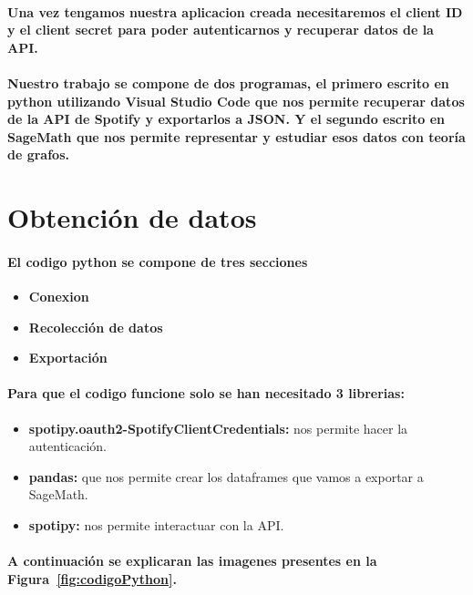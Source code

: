 \documentclass[11pt,spanish]{article}
\begin{document}
\paragraph*{Una vez tengamos nuestra aplicacion creada necesitaremos el client ID y el client secret para poder autenticarnos 
y recuperar datos de la API.}

\paragraph*{Nuestro trabajo se compone de dos programas, el primero escrito en python utilizando Visual Studio Code
que nos permite recuperar datos de la API de Spotify y exportarlos a JSON. 
Y el segundo escrito en SageMath que nos permite representar y estudiar esos datos con teoría de grafos.}

\section{Obtención de datos}

\paragraph*{El codigo python se compone de tres secciones}
\begin{itemize}
	\item \textbf{Conexion}
	\item \textbf{Recolección de datos}
	\item \textbf{Exportación}
\end{itemize}

\paragraph*{Para que el codigo funcione solo se han necesitado 3 librerias:}
\begin{itemize}
	\item \textbf{spotipy.oauth2-SpotifyClientCredentials:} nos permite hacer la autenticación.
	\item \textbf{pandas:} que nos permite crear los dataframes que vamos a exportar a SageMath.
	\item \textbf{spotipy:} nos permite interactuar con la API.
\end{itemize}
\paragraph*{A continuación se explicaran las imagenes presentes en la Figura~\ref{fig:codigoPython}.}
\end{document}
